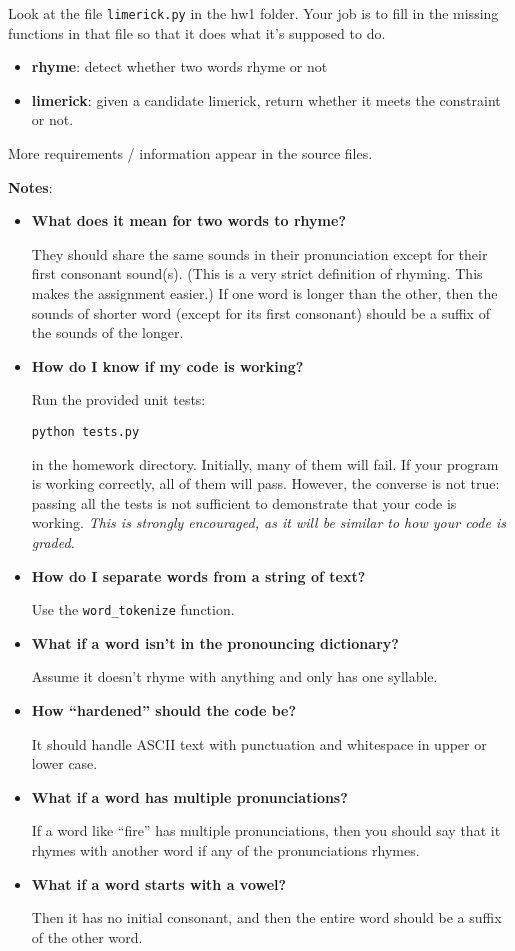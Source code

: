 \documentclass[11pt]{article}
\begin{document}
Look at the file \texttt{limerick.py} in the hw1 folder.  Your job is to fill
in the missing functions in that file so that it does what it’s
supposed to do.
\begin{itemize}
\item {\bf rhyme}: detect whether two words rhyme or not
\item {\bf limerick}: given a candidate limerick, return whether it meets the
constraint or not.
\end{itemize}
More requirements / information appear in the source files.

\clearpage

\noindent \textbf{Notes}:
\begin{itemize}
\item {\bf What does it mean for two words to rhyme?}

They should share the same sounds in their pronunciation except for their first consonant sound(s).  (This is a very strict definition of rhyming.  This makes the assignment easier.)  If one word is longer than the other, then the sounds of shorter word (except for its first consonant) should be a suffix of the sounds of the longer.

\item {\bf How do I know if my code is working?}

Run the provided unit tests:

\texttt{python tests.py}

in the homework directory.  Initially, many of them will fail.  If your program is working correctly, all of them will pass.  However, the converse is not true: passing all the tests is not sufficient to demonstrate that your code is working.  \emph{This is strongly encouraged, as it will be similar to how your code is graded.}

\item {\bf How do I separate words from a string of text?}

Use the \texttt{word\_tokenize} function.

\item {\bf What if a word isn’t in the pronouncing dictionary?}

Assume it doesn’t rhyme with anything and only has one syllable.

\item {\bf How ``hardened'' should the code be?}

It should handle ASCII text with punctuation and whitespace in upper or lower case.

\item {\bf What if a word has multiple pronunciations?}

If a word like “fire” has multiple pronunciations, then you should say
that it rhymes with another word if any of the pronunciations rhymes.

\item {\bf What if a word starts with a vowel?}

Then it has no initial consonant, and then the entire word should be a
suffix of the other word.
\end{itemize}
\end{document}

